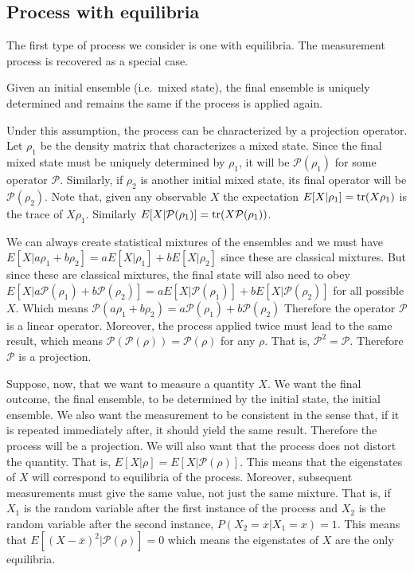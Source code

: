 \documentclass[11pt,letterpaper,fleqn]{memoir} %
\begin{document}
\subsection{Process with equilibria}

The first type of process we consider is one with equilibria. The measurement process is recovered as a special case.

\begin{assump}
	Given an initial ensemble (i.e.~mixed state), the final ensemble is uniquely determined and remains the same if the process is applied again.
\end{assump}

Under this assumption, the process can be characterized by a projection operator. Let $\rho_1$ be the density matrix that characterizes a mixed state. Since the final mixed state must be uniquely determined by $\rho_1$, it will be $\mathcal{P}(\rho_1)$ for some operator $\mathcal{P}$. Similarly, if $\rho_2$ is another initial mixed state, its final operator will be $\mathcal{P}(\rho_2)$. Note that, given any observable $X$ the expectation $E[X|\rho_1] = \operatorname{tr}(X\rho_1)$ is the trace of $X\rho_1$. Similarly $E[X|\mathcal{P}(\rho_1)] = \operatorname{tr}(X \mathcal{P}(\rho_1))$.

We can always create statistical mixtures of the ensembles and we must have $E[X|a \rho_1 + b \rho_2] = a E[X|\rho_1] + b E[X|\rho_2]$ since these are classical mixtures. But since these are classical mixtures, the final state will also need to obey $E[X|a \mathcal{P}(\rho_1) + b \mathcal{P}(\rho_2)] = a E[X|\mathcal{P}(\rho_1)] + b E[X|\mathcal{P}(\rho_2)]$ for all possible $X$. Which means $\mathcal{P}(a \rho_1 + b \rho_2) = a \mathcal{P}(\rho_1) + b \mathcal{P}(\rho_2)$ Therefore the operator $\mathcal{P}$ is a linear operator. Moreover, the process applied twice must lead to the same result, which means $\mathcal{P}(\mathcal{P}(\rho)) = \mathcal{P}(\rho)$ for any $\rho$. That is, $\mathcal{P}^2 = \mathcal{P}$. Therefore $\mathcal{P}$ is a projection.

Suppose, now, that we want to measure a quantity $X$. We want the final outcome, the final ensemble, to be determined by the initial state, the initial ensemble. We also want the measurement to be consistent in the sense that, if it is repeated immediately after, it should yield the same result. Therefore the process will be a projection. We will also want that the process does not distort the quantity. That is, $E[X|\rho] = E[X|\mathcal{P}(\rho)]$. This means that the eigenstates of $X$ will correspond to equilibria of the process. Moreover, subsequent measurements must give the same value, not just the same mixture. That is, if $X_1$ is the random variable after the first instance of the process and $X_2$ is the random variable after the second instance, $P(X_2 = x| X_1 = x ) = 1$. This means that $E[(X - \bar{x})^2|\mathcal{P}(\rho)] = 0$ which means the eigenstates of $X$ are the only equilibria.
\end{document}
